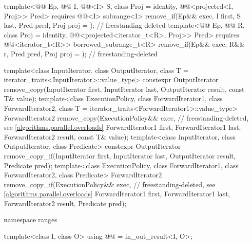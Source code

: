 \begin{codeblock}
{{    template<@@ Ep, @@ I, @@<I> S,
             class Proj = identity, @@<projected<I, Proj>> Pred>
      requires @@<I>
      subrange<I>
        remove_if(Ep&& exec, I first, S last, Pred pred, Proj proj = {});   // freestanding-deleted
    template<@@ Ep, @@ R, class Proj = identity,
             @@<projected<iterator_t<R>, Proj>> Pred>
      requires @@<iterator_t<R>>
      borrowed_subrange_t<R>
        remove_if(Ep&& exec, R&& r, Pred pred, Proj proj = {});             // freestanding-deleted
  }

  template<class InputIterator, class OutputIterator,
           class T = iterator_traits<InputIterator>::value_type>
    constexpr OutputIterator
      remove_copy(InputIterator first, InputIterator last,
                  OutputIterator result, const T& value);
  template<class ExecutionPolicy, class ForwardIterator1, class ForwardIterator2,
           class T = iterator_traits<ForwardIterator1>::value_type>
    ForwardIterator2
      remove_copy(ExecutionPolicy&& exec,                       // freestanding-deleted, see \ref{algorithms.parallel.overloads}
                  ForwardIterator1 first, ForwardIterator1 last,
                  ForwardIterator2 result, const T& value);
  template<class InputIterator, class OutputIterator, class Predicate>
    constexpr OutputIterator
      remove_copy_if(InputIterator first, InputIterator last,
                     OutputIterator result, Predicate pred);
  template<class ExecutionPolicy, class ForwardIterator1, class ForwardIterator2,
           class Predicate>
    ForwardIterator2
      remove_copy_if(ExecutionPolicy&& exec,                    // freestanding-deleted, see \ref{algorithms.parallel.overloads}
                     ForwardIterator1 first, ForwardIterator1 last,
                     ForwardIterator2 result, Predicate pred);

  namespace ranges {
    template<class I, class O>
      using @@ = in_out_result<I, O>;

}}
\end{codeblock}
